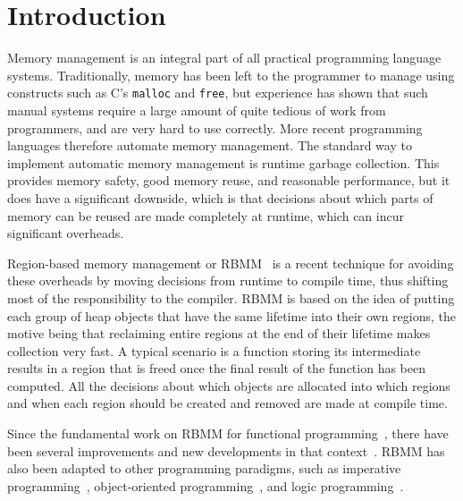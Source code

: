 \documentclass{tlp}
\newcommand{\code}[1]{{\tt#1}}
\begin{document}
\section{Introduction}

Memory management is an integral part
of all practical programming language systems.
Traditionally, memory has been left to the programmer to manage
using constructs such as C's \code{malloc} and \code{free},
but experience has shown that such manual systems
require a large amount of quite tedious of work from programmers,
and are very hard to use correctly.
More recent programming languages therefore automate memory management.
The standard way to implement automatic memory management
is runtime garbage collection.
This provides memory safety, good memory reuse, and reasonable performance,
but it does have a significant downside, which is that
decisions about which parts of memory can be reused
are made completely at runtime, which can incur significant overheads.

Region-based memory management or RBMM~\cite{TofteTalpin97}
is a recent technique for avoiding these overheads
by moving decisions from runtime to compile time,
thus shifting most of the responsibility to the compiler.
RBMM is based on the idea of
putting each group of heap objects that have the same lifetime
into their own regions,
the motive being that reclaiming entire regions at the end of their lifetime
makes collection very fast.
A typical scenario is a function storing its intermediate results in a region
that is freed once the final result of the function has been computed.
All the decisions about which objects are allocated into which regions
and when each region should be created and removed are made at compile time.

Since the fundamental work on RBMM
for functional programming~\cite{TofteTalpin97},
there have been several improvements and new developments
in that context~\cite{Aiken95better,Birkedal96from,Henglein01hmn}.
RBMM has also been adapted to other programming paradigms,
such as imperative programming~\cite{Gay98memory,Grossman02cyclone},
object-oriented programming~\cite{Cherem04,Chin04},
and logic programming~\cite{Makholm00,Makholm00master,MakholmSagonas02}.
\end{document}
